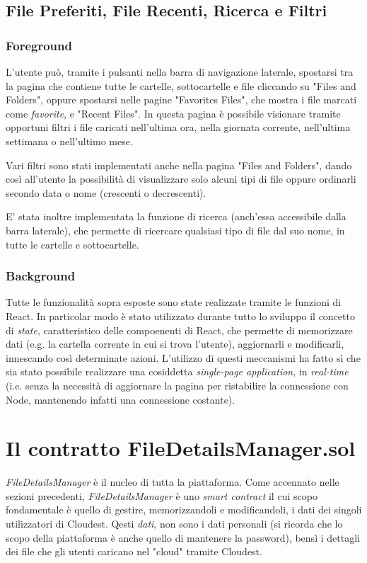 \documentclass{article}
\begin{document}
\subsection{File Preferiti, File Recenti, Ricerca e Filtri}
\subsubsection{Foreground}
L'utente può, tramite i pulsanti nella barra di navigazione laterale, spostarsi tra la pagina che contiene tutte le cartelle, sottocartelle e file cliccando su "Files and Folders", oppure spostarsi nelle pagine "Favorites Files", che mostra i file marcati come \textit{favorite}, e "Recent Files". In questa pagina è possibile visionare tramite opportuni filtri i file caricati nell'ultima ora, nella giornata corrente, nell'ultima settimana o nell'ultimo mese.

Vari filtri sono stati implementati anche nella pagina "Files and Folders", dando così all'utente la possibilità di visualizzare solo alcuni tipi di file oppure ordinarli secondo data o nome (crescenti o decrescenti).

E' stata inoltre implementata la funzione di ricerca (anch'essa accessibile dalla barra laterale), che permette di ricercare qualsiasi tipo di file dal suo nome, in tutte le cartelle e sottocartelle.

\subsubsection{Background}
Tutte le funzionalità sopra esposte sono state realizzate tramite le funzioni di React. In particolar modo è stato utilizzato durante tutto lo sviluppo il concetto di \textit{state}, caratteristico delle compoenenti di React, che permette di memorizzare dati (e.g. la cartella corrente in cui si trova l'utente), aggiornarli e modificarli, innescando così determinate azioni. L'utilizzo di questi meccanismi ha fatto sì che sia stato possibile realizzare una cosiddetta \textit{single-page application}, in \textit{real-time} (i.e. senza la necessità di aggiornare la pagina per ristabilire la connessione con Node, mantenendo infatti una connessione costante).

\newpage

\section{Il contratto FileDetailsManager.sol}
\textit{FileDetailsManager} è il nucleo di tutta la piattaforma. Come accennato nelle sezioni precedenti, \textit{FileDetailsManager} è uno \textit{smart contract} il cui scopo fondamentale è quello di gestire, memorizzandoli e modificandoli, i dati dei singoli utilizzatori di Cloudest. Qesti \textit{dati}, non sono i dati personali (si ricorda che lo scopo della piattaforma è anche quello di mantenere la password), bensì i dettagli dei file che gli utenti caricano nel "cloud" tramite Cloudest.
\end{document}
